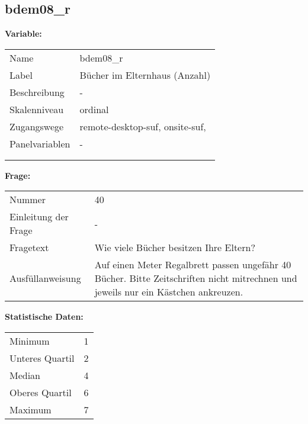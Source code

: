 	
	
	\subsection{bdem08\_r}
	\label{subSection:bdem08_r}

	\noindent\textbf{Variable:}\\
		\begin{tabular}{lL{11.3cm}}
			\label{tableVariable:bdem08_r}
			Name & bdem08\_r \\
			Label & Bücher im Elternhaus (Anzahl)  \\
			Beschreibung & - \\
			Skalenniveau & ordinal \\
			Zugangswege &
				remote-desktop-suf,
				onsite-suf,
 \\
			Panelvariablen & -
			 \\
			 \\
 \\
		\end{tabular}

		\vspace*{1 cm}
		\noindent\textbf{Frage:}\\
		\begin{tabular}{lL{11.3cm}}
			\label{tableQuestion:bdem08_r}
			Nummer & 40 \\
			Einleitung der Frage & - \\
			Fragetext & Wie viele Bücher besitzen Ihre Eltern? \\
			Ausfüllanweisung & Auf einen Meter Regalbrett passen ungefähr 40 Bücher. Bitte Zeitschriften nicht mitrechnen und jeweils nur ein Kästchen ankreuzen. \\
		\end{tabular}


		\vspace*{1 cm}
		\noindent\textbf{Statistische Daten:}\\
			\begin{tabular}{ll}
				\label{tableStatistics:bdem08_r}
					Minimum & 1 \\
					Unteres Quartil & 2 \\
					Median & 4 \\
					Oberes Quartil & 6 \\
					Maximum & 7 \\
			\end{tabular}



